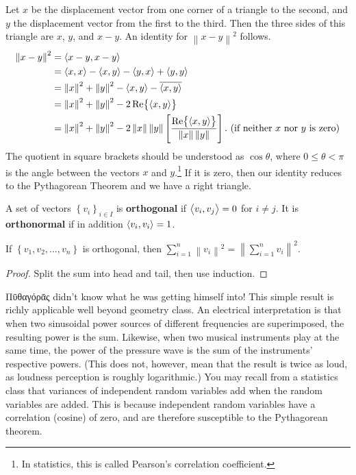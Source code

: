 Let \(x\) be the displacement vector from one corner of a triangle to the second,
and \(y\) the displacement vector from the first to the third.
Then the three sides of this triangle are \(x\), \(y\), and \(x - y\).
An identity for \(\left\|x - y\right\|^2\) follows.
\begin{align*}
  \left\|x - y\right\|^2
  &= \left\langle x - y, x - y\right\rangle\\
  &= \left\langle x, x\right\rangle - \left\langle x, y\right\rangle - \left\langle y, x\right\rangle + \left\langle y, y\right\rangle\\
  &= \left\|x\right\|^2 + \left\|y\right\|^2
  - \left\langle x, y\right\rangle - \overline{\left\langle x, y\right\rangle}\\
  &= \left\|x\right\|^2 + \left\|y\right\|^2
  - 2 \Re{ \ensuremath{\left\langle x, y\right\rangle} }\\
  &= \left\|x\right\|^2 + \left\|y\right\|^2
  - 2 \left\|x\right\|
    \left\|y\right\|
  \left[{\frac{\Re{ \ensuremath{\left\langle x, y\right\rangle} }}{\left\|x\right\|
    \left\|y\right\|}}\right].\ \text{(if neither \(x\) nor \(y\) is zero)}
\end{align*}
The quotient in square brackets should be understood as \(\cos \theta\),
where \(0 \leq \theta < \pi\) is the angle between the vectors \(x\) and \(y\).\footnote{In statistics, this is called Pearson's correlation coefficient.}
If it is zero, then our identity reduces to the Pythagorean Theorem and we have a right triangle.

\begin{definition}
  A set of vectors \(\left\{v_i\right\}_{i\in I}\)
  is \textbf{orthogonal} if \(\left\langle v_i, v_j\right\rangle = 0\) for \(i\neq j\).
  It is \textbf{orthonormal} if in addition \(\left\langle v_i, v_i\right\rangle = 1\).
\end{definition}

\begin{theorem}[Pythagoras]
  If \(\left\{v_1, v_2, \ldots, v_n\right\}\) is orthogonal, then
  \(\sum_{i=1}^{n} \left\|v_i\right\|^2 = \left\|\sum_{i=1}^{n} v_i \right\|^2\).
\end{theorem}
\begin{proof}
  Split the sum into head and tail, then use induction.
\end{proof}
{%
Πῡθαγόρᾱς}
didn't know what he was getting himself into!
This simple result is richly applicable well beyond geometry class.
An electrical interpretation is that when two sinusoidal power sources of different frequencies are superimposed, the resulting power is the sum.
Likewise, when two musical instruments play at the same time, the power of the pressure wave is the sum of the instruments' respective powers. (This does not, however, mean that the result is twice as loud, as loudness perception is roughly logarithmic.)
You may recall from a statistics class that variances of independent random variables add when the random variables are added.
This is because independent random variables have a correlation (cosine) of zero,
and are therefore susceptible to the Pythagorean theorem.

